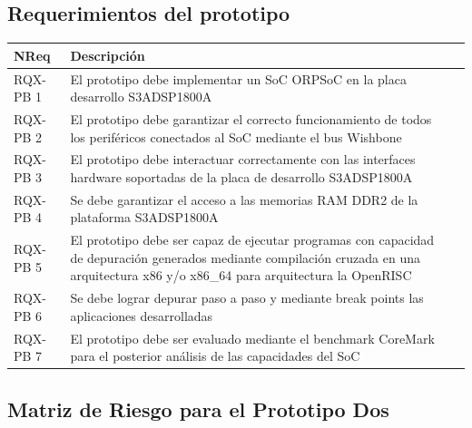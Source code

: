 		\subsection{Requerimientos del prototipo}
		\begin{table}[h!]
		\centering
		\begin{tabular}{ p{2.5cm} p{8cm} p{3cm} }
		\hline 
		\rowcolor[gray]{0.8} N\textordmasculine Req & Descripción\\
		\hline 
		RQX-PB 1 & El prototipo debe implementar un SoC ORPSoC en la placa desarrollo S3ADSP1800A\\ 
		\hline 
		RQX-PB 2 & El prototipo debe garantizar el correcto funcionamiento de todos los periféricos conectados al SoC mediante el bus Wishbone\\ 
		\hline 
		RQX-PB 3 & El prototipo debe interactuar correctamente con las interfaces hardware soportadas de la placa de desarrollo S3ADSP1800A\\ 
		\hline
		RQX-PB 4 & Se debe garantizar el acceso a las memorias RAM DDR2 de la plataforma S3ADSP1800A\\
		\hline
		RQX-PB 5 & El prototipo debe ser capaz de ejecutar programas con capacidad de depuración generados mediante compilación
		cruzada en una arquitectura x86 y/o x86\_64 para arquitectura la OpenRISC\\
		\hline
		RQX-PB 6 & Se debe lograr depurar paso a paso y mediante break points las aplicaciones desarrolladas\\
		\hline
		RQX-PB 7 & El prototipo debe ser evaluado mediante el benchmark CoreMark para el posterior análisis de las capacidades del SoC\\
		\hline		
		\end{tabular}
		\end{table}

\newpage
\subsection{Matriz de Riesgo para el Prototipo Dos} 

